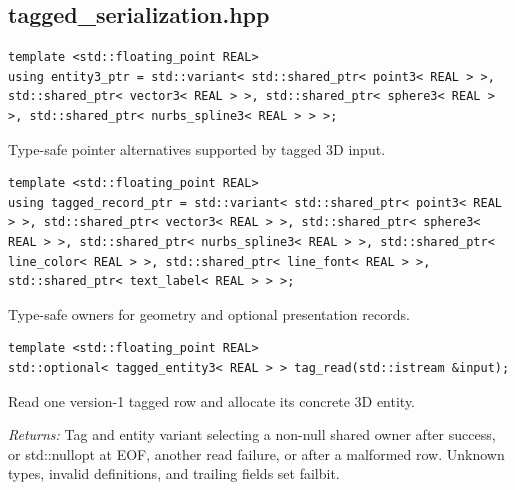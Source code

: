 \subsection{tagged\_serialization.hpp}
\par\noindent\begin{minipage}{\linewidth}
\begin{lstlisting}[style=apireference]
template <std::floating_point REAL>
using entity3_ptr = std::variant< std::shared_ptr< point3< REAL > >, std::shared_ptr< vector3< REAL > >, std::shared_ptr< sphere3< REAL > >, std::shared_ptr< nurbs_spline3< REAL > > >;
\end{lstlisting}
{\footnotesize Type-safe pointer alternatives supported by tagged 3D input.\par}
\end{minipage}\par\vspace{1pt}
\par\noindent\begin{minipage}{\linewidth}
\begin{lstlisting}[style=apireference]
template <std::floating_point REAL>
using tagged_record_ptr = std::variant< std::shared_ptr< point3< REAL > >, std::shared_ptr< vector3< REAL > >, std::shared_ptr< sphere3< REAL > >, std::shared_ptr< nurbs_spline3< REAL > >, std::shared_ptr< line_color< REAL > >, std::shared_ptr< line_font< REAL > >, std::shared_ptr< text_label< REAL > > >;
\end{lstlisting}
{\footnotesize Type-safe owners for geometry and optional presentation records.\par}
\end{minipage}\par\vspace{1pt}
\par\noindent\begin{minipage}{\linewidth}
\begin{lstlisting}[style=apireference]
template <std::floating_point REAL>
std::optional< tagged_entity3< REAL > > tag_read(std::istream &input);
\end{lstlisting}
{\footnotesize Read one version-1 tagged row and allocate its concrete 3D entity.\par}
{\footnotesize\textit{Returns:} Tag and entity variant selecting a non-null shared owner after success, or std::nullopt at EOF, another read failure, or after a malformed row. Unknown types, invalid definitions, and trailing fields set failbit.\par}
\end{minipage}\par\vspace{1pt}
